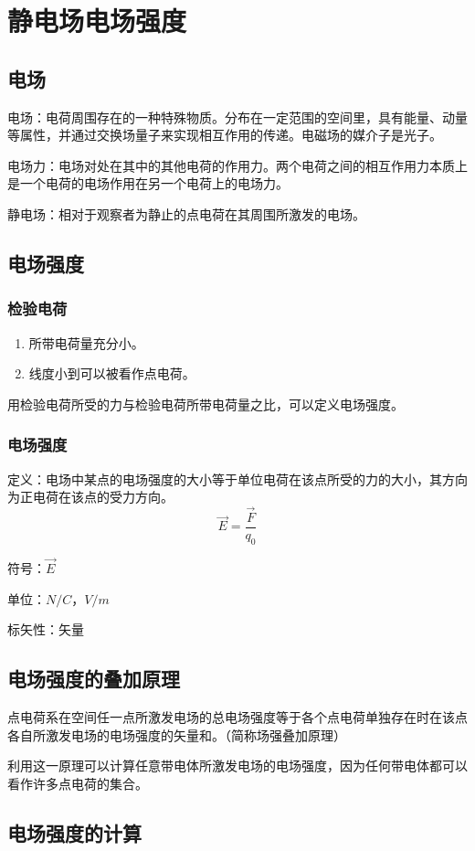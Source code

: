 \section{静电场\quad 电场强度}
\subsection{电场}
电场：电荷周围存在的一种特殊物质。分布在一定范围的空间里，具有能量、动量等属性，并通过交换场量子来实现相互作用的传递。电磁场的媒介子是光子。

电场力：电场对处在其中的其他电荷的作用力。两个电荷之间的相互作用力本质上是一个电荷的电场作用在另一个电荷上的电场力。

静电场：相对于观察者为静止的点电荷在其周围所激发的电场。

\subsection{电场强度}
\subsubsection{检验电荷}
\begin{enumerate}
	\item 所带电荷量充分小。
	\item 线度小到可以被看作点电荷。
\end{enumerate}
用检验电荷所受的力与检验电荷所带电荷量之比，可以定义电场强度。

\subsubsection{电场强度}
定义：电场中某点的电场强度的大小等于单位电荷在该点所受的力的大小，其方向为正电荷在该点的受力方向。
$$\vec{E}=\frac{\vec{F}}{q_0}$$

符号：$\vec{E}$

单位：$N/C$，$V/m$

标矢性：矢量

\subsection{电场强度的叠加原理}
点电荷系在空间任一点所激发电场的总电场强度等于各个点电荷单独存在时在该点各自所激发电场的电场强度的矢量和。（简称场强叠加原理）

利用这一原理可以计算任意带电体所激发电场的电场强度，因为任何带电体都可以看作许多点电荷的集合。

\subsection{电场强度的计算}
